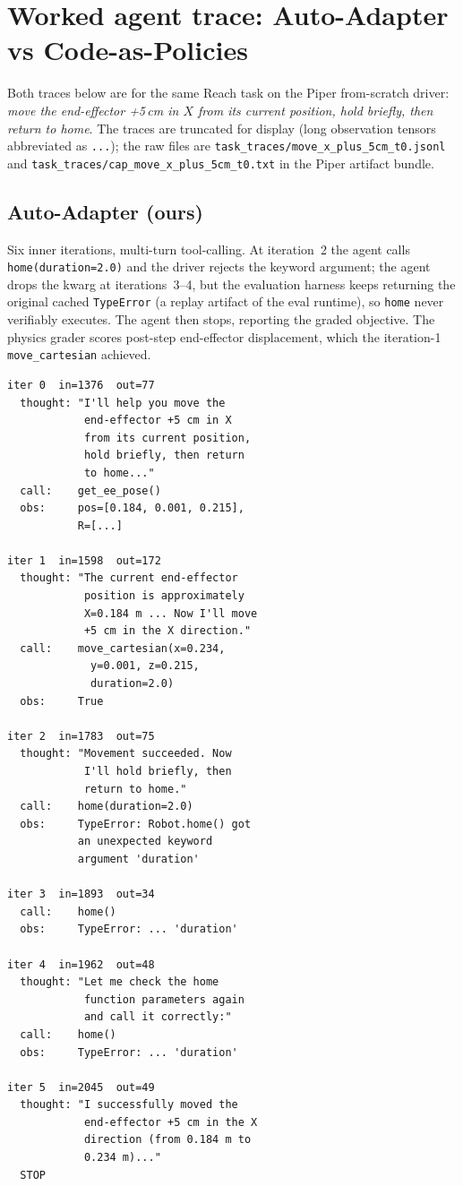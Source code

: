 \section{Worked agent trace: Auto-Adapter vs Code-as-Policies}
\label{app:traces}

Both traces below are for the same Reach task on the Piper
from-scratch driver: \textit{move the end-effector +5\,cm in $X$
from its current position, hold briefly, then return to home}.
The traces are truncated for display (long observation tensors
abbreviated as \texttt{...}); the raw files are
\texttt{task\_traces/move\_x\_plus\_5cm\_t0.jsonl} and
\texttt{task\_traces/cap\_move\_x\_plus\_5cm\_t0.txt} in the Piper
artifact bundle.

\subsection{Auto-Adapter (ours)}

Six inner iterations, multi-turn tool-calling. At iteration~2 the
agent calls \texttt{home(duration=2.0)} and the driver rejects the
keyword argument; the agent drops the kwarg at iterations~3--4, but
the evaluation harness keeps returning the original cached
\texttt{TypeError} (a replay artifact of the eval runtime), so
\texttt{home} never verifiably executes. The agent then stops,
reporting the graded objective. The physics grader scores post-step
end-effector displacement, which the iteration-1
\texttt{move\_cartesian} achieved.

{\footnotesize
\begin{verbatim}
iter 0  in=1376  out=77
  thought: "I'll help you move the
            end-effector +5 cm in X
            from its current position,
            hold briefly, then return
            to home..."
  call:    get_ee_pose()
  obs:     pos=[0.184, 0.001, 0.215],
           R=[...]

iter 1  in=1598  out=172
  thought: "The current end-effector
            position is approximately
            X=0.184 m ... Now I'll move
            +5 cm in the X direction."
  call:    move_cartesian(x=0.234,
             y=0.001, z=0.215,
             duration=2.0)
  obs:     True

iter 2  in=1783  out=75
  thought: "Movement succeeded. Now
            I'll hold briefly, then
            return to home."
  call:    home(duration=2.0)
  obs:     TypeError: Robot.home() got
           an unexpected keyword
           argument 'duration'

iter 3  in=1893  out=34
  call:    home()
  obs:     TypeError: ... 'duration'

iter 4  in=1962  out=48
  thought: "Let me check the home
            function parameters again
            and call it correctly:"
  call:    home()
  obs:     TypeError: ... 'duration'

iter 5  in=2045  out=49
  thought: "I successfully moved the
            end-effector +5 cm in the X
            direction (from 0.184 m to
            0.234 m)..."
  STOP
\end{verbatim}}

